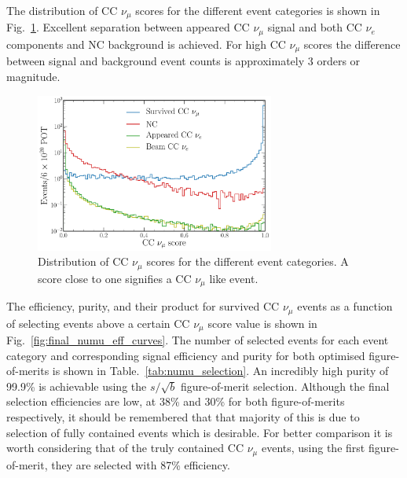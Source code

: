 The distribution of CC $\nu_{\mu}$ scores for the different event categories is shown in
Fig.~\ref{fig:final_beam_numu_outputs}. Excellent separation between appeared CC $\nu_{\mu}$
signal and both CC $\nu_{e}$ components and NC background is achieved. For high CC $\nu_{\mu}$
scores the difference between signal and background event counts is approximately 3 orders or
magnitude.

\begin{figure} %
    \includegraphics[width=0.7\textwidth]{diagrams/6-cvn/chipsnet/final_beam_numu_outputs.pdf}
    \caption[Distribution of CC $\nu_{\mu}$ scores from the trained beam classification network.]
    {Distribution of CC $\nu_{\mu}$ scores for the different event categories. A score close to
        one signifies a CC $\nu_{\mu}$ like event.}
    \label{fig:final_beam_numu_outputs}
\end{figure}

The efficiency, purity, and their product for survived CC $\nu_{\mu}$ events as a function of
selecting events above a certain CC $\nu_{\mu}$ score value is shown in
Fig.~\ref{fig:final_numu_eff_curves}. The number of selected events for each event category and
corresponding signal efficiency and purity for both optimised figure-of-merits is shown in
Table.~\ref{tab:numu_selection}. An incredibly high purity of 99.9\% is achievable using the
$s/\sqrt{b}$ figure-of-merit selection. Although the final selection efficiencies are low, at 38\%
and 30\% for both figure-of-merits respectively, it should be remembered that that majority of
this is due to selection of fully contained events which is desirable. For better comparison it is
worth considering that of the truly contained CC $\nu_{\mu}$ events, using the first
figure-of-merit, they are selected with 87\% efficiency.

